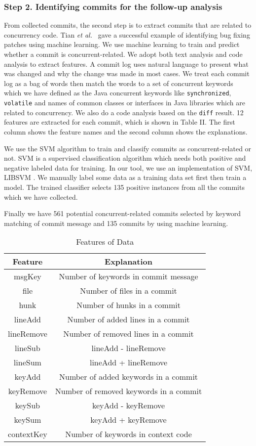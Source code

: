 \subsubsection{Step 2. Identifying commits for the follow-up analysis} From collected commits, the second step is to extract commits that are related to concurrency code. Tian \emph{et al.}~\cite{conf/icse/TianLL12} gave a successful example of identifying bug fixing patches using machine learning. We use machine learning to train and predict whether a commit is concurrent-related. We adopt both text analysis and code analysis to extract features. A commit log uses natural language to present what was changed and why the change was made in most cases. We treat each commit log as a bag of words then match the words to a set of concurrent keywords which we have defined as the Java concurrent keywords like \texttt{synchronized}, \texttt{volatile} and names of common classes or interfaces in Java libraries which are related to concurrency. We also do a code analysis based on the \texttt{diff} result. 12 features are extracted for each commit, which is shown in Table II. The first column shows the feature names and the second column shows the explanations.

We use the SVM \cite{journals/ml/CortesV95} algorithm to train and classify commits as concurrent-related or not. SVM is a supervised classification algorithm which needs both positive and negative labeled data for training. In our tool, we use an implementation of SVM, LIBSVM \cite{libsvm}. We manually label some data as a training data set first then train a model. The trained classifier selects 135 positive instances from all the commits which we have collected.

Finally we have 561 potential concurrent-related commits selected by keyword matching of commit message and 135 commits by using machine learning.

\begin{table}
	\centering
	\caption{Features of Data}
	\begin{tabular}{|c|c|}\hline
		Feature&Explanation\\\hline
		msgKey&Number of keywords in commit message\\
		file&Number of files in a commit\\
		hunk&Number of hunks in a commit\\
		lineAdd&Number of added lines in a commit\\
		lineRemove&Number of removed lines in a commit\\
		lineSub&lineAdd - lineRemove\\
		lineSum&lineAdd + lineRemove\\
		keyAdd&Number of added keywords in a commit\\
		keyRemove&Number of removed keywords in a commit\\
		keySub&keyAdd - keyRemove\\
		keySum&keyAdd + keyRemove\\
		contextKey&Number of keywords in context code\\\hline
	\end{tabular}
\end{table}

